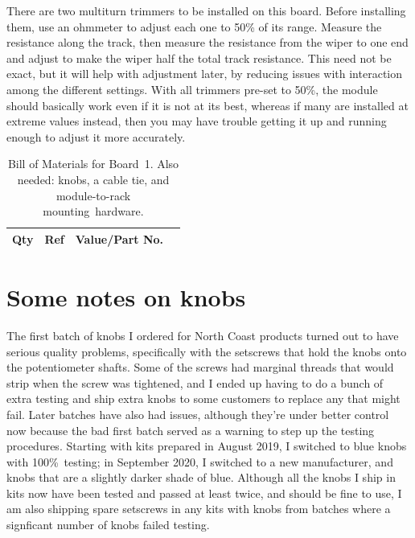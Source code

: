 There are two multiturn trimmers to be installed on this board.  Before
installing them, use an ohmmeter to adjust each one to 50\% of its range. 
Measure the resistance along the track, then measure the resistance from the
wiper to one end and adjust to make the wiper half the total track
resistance.  This need not be exact, but it will help with adjustment later,
by reducing issues with interaction among the different settings.  With all
trimmers pre-set to 50\%, the module should basically work even if it is not
at its best, whereas if many are installed at extreme values instead, then
you may have trouble getting it up and running enough to adjust it more
accurately.

\begin{table}
{\centering
{}
\vspace{\baselineskip}

\begin{tabular}{rp{1in}cp{3in}}
  \textbf{Qty} & \textbf{Ref} & \textbf{Value/Part No.} & \\ \hline

\end{tabular}\par}
\caption{Bill of Materials for Board~1.  Also needed:  knobs, a cable tie,
and module-to-rack mounting~hardware.}\label{tab:b1bom}
\end{table}

\section{Some notes on knobs}

The first batch of knobs I ordered for North Coast products turned out to
have serious quality problems, specifically with the setscrews that hold the
knobs onto the potentiometer shafts.  Some of the screws had marginal
threads that would strip when the screw was tightened, and I ended up having
to do a bunch of extra testing and ship extra knobs to some customers to
replace any that might fail.  Later batches have also had issues, although
they're under better control now because the bad first batch served as a
warning to step up the testing procedures.  Starting with kits prepared in
August 2019, I switched to blue knobs with 100\%\ testing; in September
2020, I switched to a new manufacturer, and knobs that are a slightly darker
shade of blue.  Although all the knobs I ship in kits now have been tested
and passed at least twice, and should be fine to use, I am also shipping
spare setscrews in any kits with knobs from batches where a signficant
number of knobs failed testing.

